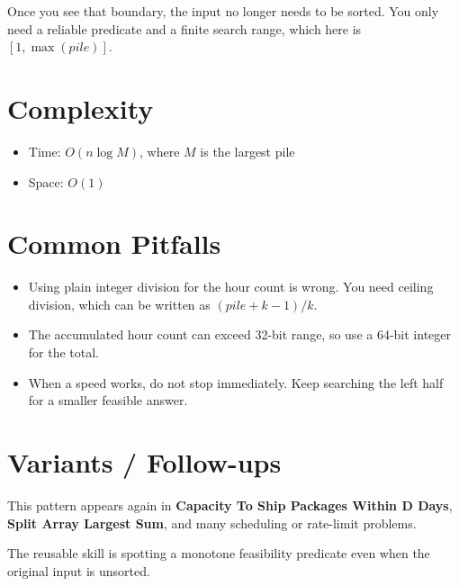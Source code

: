 Once you see that boundary, the input no longer needs to be sorted. You only need a reliable predicate and a finite search range, which here is \([1, \max(pile)]\).

\section{Complexity}
\begin{itemize}
\item Time: \(O(n \log M)\), where \(M\) is the largest pile
\item Space: \(O(1)\)
\end{itemize}

\section{Common Pitfalls}
\begin{itemize}
\item Using plain integer division for the hour count is wrong. You need ceiling division, which can be written as \((pile + k - 1) / k\).
\item The accumulated hour count can exceed 32-bit range, so use a 64-bit integer for the total.
\item When a speed works, do not stop immediately. Keep searching the left half for a smaller feasible answer.
\end{itemize}

\section{Variants / Follow-ups}
This pattern appears again in \textbf{Capacity To Ship Packages Within D Days}, \textbf{Split Array Largest Sum}, and many scheduling or rate-limit problems.

The reusable skill is spotting a monotone feasibility predicate even when the original input is unsorted.
